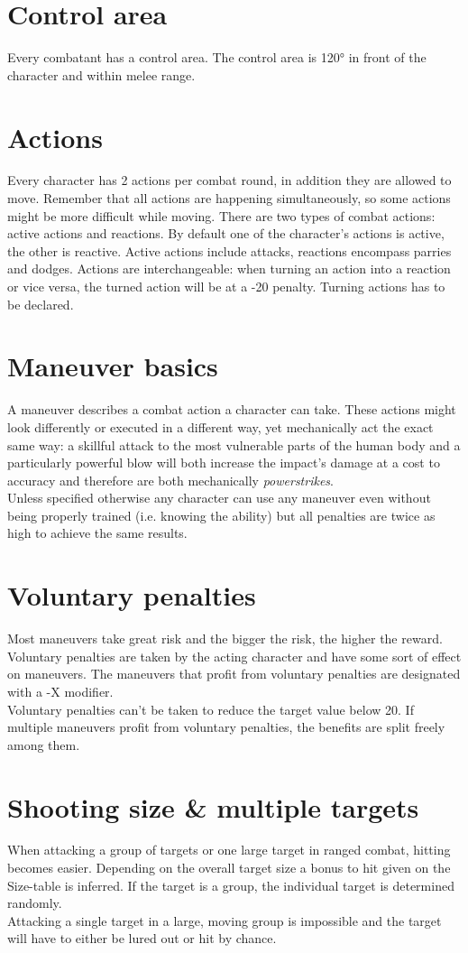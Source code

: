 \documentclass[12pt,a4paper]{book}
\begin{document}
	\section{Control area}
	Every combatant has a control area. The control area is 120° in front of the character and within melee range.
	\section{Actions}
	Every character has 2 actions per combat round, in addition they are allowed to move. Remember that all actions are happening simultaneously, so some actions might be more difficult while moving.
	There are two types of combat actions: active actions and reactions. By default one of the character’s actions is active, the other is reactive. Active actions include attacks, reactions encompass parries and dodges. Actions are interchangeable: when turning an action into a reaction or vice versa, the turned action will be at a -20 penalty. Turning actions has to be declared.
	\section{Maneuver basics}
	A maneuver describes a combat action a character can take. These actions might look differently or executed in a different way, yet mechanically act the exact same way: a skillful attack to the most vulnerable parts of the human body and a particularly powerful blow will both increase the impact’s damage at a cost to accuracy and therefore are both mechanically \textit{powerstrikes}.\\
	Unless specified otherwise any character can use any maneuver even without being properly trained (i.e. knowing the ability) but all penalties are twice as high to achieve the same results.
	\section{Voluntary penalties}
	Most maneuvers take great risk and the bigger the risk, the higher the reward. Voluntary penalties are taken by the acting character and have some sort of effect on maneuvers. The maneuvers that profit from voluntary penalties are designated with a -X modifier.\\
	Voluntary penalties can’t be taken to reduce the target value below 20. If multiple maneuvers profit from voluntary penalties, the benefits are split freely among them.
	\section{Shooting size \& multiple targets}
	When attacking a group of targets or one large target in ranged combat, hitting becomes easier. Depending on the overall target size a bonus to hit given on the Size-table is inferred. If the target is a group, the individual target is determined randomly.\\
	Attacking a single target in a large, moving group is impossible and the target will have to either be lured out or hit by chance.
\end{document}

